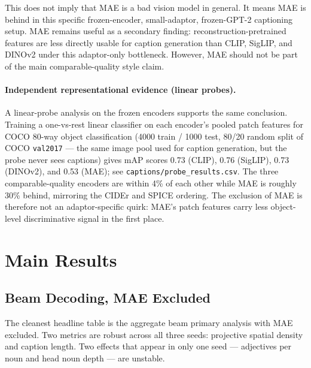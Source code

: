 \documentclass[11pt]{article}
\newcommand{\code}[1]{\texttt{#1}}
\begin{document}
This does not imply that MAE is a bad vision model in general. It means MAE is
behind in this specific frozen-encoder, small-adaptor, frozen-GPT-2 captioning
setup. MAE remains useful as a secondary finding: reconstruction-pretrained
features are less directly usable for caption generation than CLIP, SigLIP,
and DINOv2 under this adaptor-only bottleneck. However, MAE should not be part of
the main comparable-quality style claim.

\paragraph{Independent representational evidence (linear probes).} A
linear-probe analysis on the frozen encoders supports the same conclusion.
Training a one-vs-rest linear classifier on each encoder's pooled patch
features for COCO 80-way object classification (4000 train / 1000 test,
80/20 random split of COCO \code{val2017} --- the same image pool used
for caption generation, but the probe never sees captions) gives mAP
scores 0.73 (CLIP), 0.76 (SigLIP), 0.73 (DINOv2), and 0.53 (MAE); see
\code{captions/probe\_results.csv}. The three
comparable-quality encoders are within 4\% of each other while MAE is
roughly 30\% behind, mirroring the CIDEr and SPICE ordering. The
exclusion of MAE is therefore not an adaptor-specific quirk: MAE's patch
features carry less object-level discriminative signal in the first
place.

\section{Main Results}

\subsection{Beam Decoding, MAE Excluded}

The cleanest headline table is the aggregate beam primary analysis with MAE
excluded. Two metrics are robust across all three seeds: projective spatial
density and caption length. Two effects that appear in only one seed --- adjectives
per noun and head noun depth --- are unstable.
\end{document}
